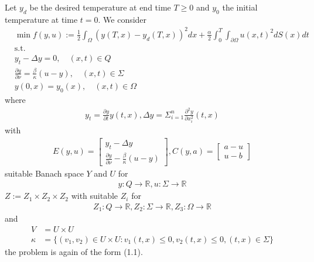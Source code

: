 \begin{example}
	Let $y_d$ be the desired temperature at end time $T \geq 0$ and $y_0$ the initial temperature at time $t = 0$. We consider 
	\begin{align*}
		&\min f(y, u) := \frac{1}{2} \int_\Omega (y(T, x) - y_d(T, x))^2 dx + \frac{\alpha}{2} \int_0^T \int_{\partial \Omega} u(x, t)^2 dS(x)dt\\
		&\text{s.t.}\\
		&y_t - \Delta y = 0, \quad (x, t) \in   Q\\
		&\frac{\partial y}{\partial \nu} = \frac{\beta}{\kappa}(u - y), \quad  (x, t) \in \Sigma \\
		&y(0, x) = y_0(x), \quad (x, t)\in  \Omega
	\end{align*}
	where
	\begin{align*}
		y_t = \frac{\partial y}{\partial t} y(t, x), \Delta y = \Sigma_{i = 1}^n \frac{\partial^2 y}{\partial x_i^2}(t, x)
	\end{align*}
	with
	\begin{align*}
		E(y, u)= 
		\begin{bmatrix}
			y_t - \Delta y\\
			\frac{\partial y}{\partial \nu} - \frac{\beta}{\kappa} (u - y)
		\end{bmatrix}, C(y, a) = 
		\begin{bmatrix}
			a - u\\
			u - b
		\end{bmatrix}
	\end{align*}
	suitable Banach space $Y$ and $U$ for 
	\begin{align*}
		y: Q \rightarrow \mathbb{R}, u: \Sigma \rightarrow \mathbb{R}
	\end{align*}
	$Z:= Z_1 \times Z_2 \times Z_2$ with suitable $Z_i$ for 
	\begin{align*}
		Z_1: Q \rightarrow \mathbb{R}, Z_2: \Sigma \rightarrow \mathbb{R}, Z_3: \Omega \rightarrow \mathbb{R}
	\end{align*}
	and 
	\begin{align*}
		V &= U \times U\\
		\kappa &= \{(v_1, v_2) \in U \times U: v_1(t, x)\le 0, v_2(t, x) \le 0, (t, x) \in \Sigma \}
	\end{align*}
	the problem is again of the form (1.1). 
\end{example}


